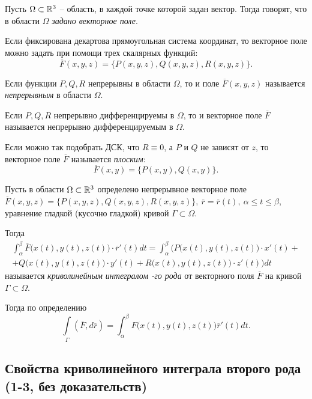 \begin{note}
    Пусть $ \Omega \subset \mathbb{R}^3 $ -- область, в каждой точке которой задан вектор. Тогда говорят, что в области $ \Omega $ \emph{задано векторное поле}.

    Если фиксирована декартова прямоугольная система координат, то векторное поле можно задать при помощи трех скалярных функций:
    \[
        \overline{F}(x,y,z) = \big\{P(x,y,z),Q(x,y,z),R(x,y,z)\}.
    \]

    Если функции $ P,Q,R $ непрерывны в области $ \Omega $, то и поле $ \overline{F}(x,y,z) $ называется \emph{непрерывным} в области $ \Omega $.

    Если $ P,Q,R $ непрерывно дифференцируемы в $ \Omega $, то и векторное поле $ \overline{F} $ называется непрерывно дифференцируемым в $ \Omega $.

    Если можно так подобрать ДСК, что $ R \equiv 0 $, а $ P $ и $ Q $ не зависят от $ z $, то векторное поле $ \overline{F} $ называется \emph{плоским}:
    \[
        \overline{F}(x,y) = \big\{P(x,y),Q(x,y)\big\}.
    \]

    Пусть в области $ \Omega \subset \mathbb{R}^3 $ определено непрерывное векторное поле $ \overline{F}(x,y,z) = \big\{P(x,y,z),Q(x,y,z),R(x,y,z)\}, \ \overline{r} = \overline{r}(t), \ \alpha \leqslant t \leqslant \beta $, уравнение гладкой (кусочно гладкой) кривой $ \Gamma \subset \Omega $.

    Тогда
    \begin{multline*}
        \int_{\alpha}^{\beta}\overline{F}\big(x(t),y(t),z(t)\big)\cdot \overline{r}'(t)dt = \int_{\alpha}^{\beta}\Big(P\big(x(t),y(t),z(t)\big)\cdot x'(t) + \\
        + Q\big(x(t),y(t),z(t)\big)\cdot y'(t) + R\big(x(t),y(t),z(t)\big)\cdot z'(t)\Big)dt
    \end{multline*}
    называется \emph{криволинейным интегралом -го рода} от векторного поля $ \overline{F} $ на кривой $ \Gamma \subset \Omega $.

    Тогда по определению
    \[
        \int\limits_\Gamma(\overline{F},d \overline{r}) = \int_{\alpha}^{\beta}F\big(x(t),y(t),z(t)\big)\overline{r}'(t)dt.
    \]
\end{note}

\subsection{Свойства криволинейного интеграла второго рода (1-3, без доказательств)}

